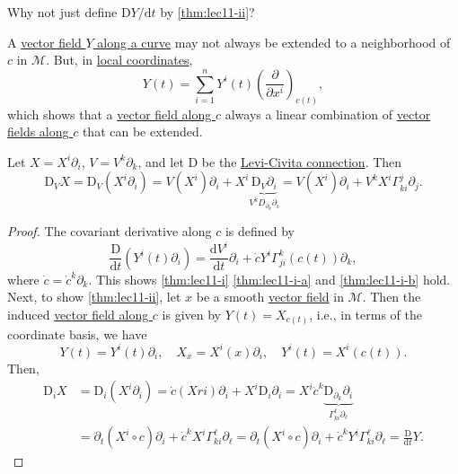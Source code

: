 \begin{problem}
Why not just define \(\mathrm{D} Y / \mathrm{d} t\) by \autoref{thm:lec11-ii}?
\end{problem}
\begin{answer}
	A \hyperref[def:vector-field-along-a-curve]{vector field \(Y\) along a curve} may not always be extended to a neighborhood of \(c\) in \(\mathcal{M} \). But, in \hyperref[def:coordinate-chart]{local coordinates},
	\[
		Y(t) = \sum_{i=1}^{n} Y^i (t) \left( \frac{\partial }{\partial x^i}  \right) _{c(t)},
	\]
	which shows that a \hyperref[def:vector-field-along-a-curve]{vector field along \(c\)} always a linear combination of \hyperref[def:vector-field-along-a-curve]{vector fields along \(c\)} that can be extended.
\end{answer}

\begin{prev}
	Let \(X = X^i \partial _i\), \(V = V^k \partial _k\), and let \(\mathrm{D} \) be the \hyperref[def:Levi-Civita-connection]{Levi-Civita connection}. Then
	\[
		\mathrm{D}_V X
		= \mathrm{D} _V(X^i \partial _i)
		= V(X^i) \partial _i + X^i \underbrace{\mathrm{D} _V \partial _i}_{V^k D_{\partial _k} \partial _i}
		= V(X^i)\partial _i + V^k X^i \Gamma ^j_{ki}\partial _j.
	\]
\end{prev}
\begin{proof}
	The covariant derivative along \(c\) is defined by
	\[
		\frac{\mathrm{D}}{\mathrm{d}t} (Y^i (t)\partial _i)
		= \frac{\mathrm{d}V^i}{\mathrm{d}t} \partial _i + \dot{c}Y^i \Gamma _{ji}^k(c(t)) \partial _k,
	\]
	where \(\dot{c} = \dot{c}^k \partial _k\). This shows \autoref{thm:lec11-i} \autoref{thm:lec11-i-a} and \autoref{thm:lec11-i-b} hold. Next, to show \autoref{thm:lec11-ii}, let \(x\) be a smooth \hyperref[def:vector-field]{vector field} in \(\mathcal{M} \). Then the induced \hyperref[def:vector-field-along-a-curve]{vector field along \(c\)} is given by \(Y(t)=X_{c(t)}\), i.e., in terms of the coordinate basis, we have
	\[
		Y(t) = Y^i(t)\partial _i,\quad X_x= X^i(x)\partial _i,\quad Y^i(t) = X^i (c(t)).
	\]
	Then,
	\[
		\begin{split}
			\mathrm{D} _i X
			&= \mathrm{D} _i (X^i \partial _i)
			= \dot{c}(Xri)\partial _i + X^i \mathrm{D} _i \partial _i
			= X^i \dot{c}^k \underbrace{\mathrm{D} _{\partial _k} \partial _i}_{\Gamma _{ki}^{\ell } \partial _\ell }\\
			&= \partial _t(X^i \circ c)\partial _i + \dot{c}^k X^i \Gamma ^\ell _{ki}\partial _\ell
			= \partial _t(X^i \circ c)\partial _i + \dot{c}^k Y^i \Gamma ^\ell _{ki}\partial _\ell
			= \frac{\mathrm{D}}{\mathrm{d} t} Y.
		\end{split}
	\]
\end{proof}

